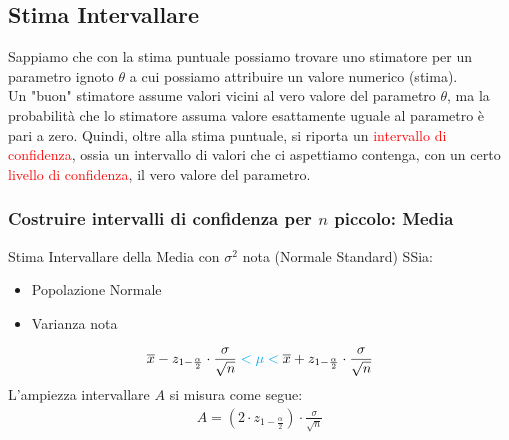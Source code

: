 \documentclass{article}  %
\theoremstyle{definition}
\begin{document}
\subsection{Stima Intervallare}
Sappiamo che con la stima puntuale possiamo trovare uno stimatore per un parametro ignoto $\theta$ a cui possiamo attribuire un valore numerico (stima). \\ Un "buon"
stimatore assume valori vicini al vero valore del parametro $\theta$, ma la probabilità che lo stimatore assuma valore esattamente uguale al parametro è pari a zero. Quindi, oltre
alla stima puntuale, si riporta un \textcolor{red}{intervallo di confidenza}, ossia un intervallo di valori che ci aspettiamo contenga, con un certo \textcolor{red}{livello di confidenza},
il vero valore del parametro.
\subsubsection{Costruire intervalli di confidenza per $n$ piccolo: Media}
\begin{theorem}{Stima Intervallare della Media con $\sigma^2$ nota (Normale Standard)}
	SSia:
	\begin{itemize}
		\item Popolazione Normale
		\item Varianza nota
	\end{itemize}
	\begin{align*}
		\overline{x}-z_{1-\frac{\alpha}{2}}\cdot \frac{\sigma}{\sqrt{n}} \textcolor{cyan}{\; < \mu < \;} \overline{x}+z_{1-\frac{\alpha}{2}}\cdot \frac{\sigma}{\sqrt{n}}
	\end{align*}
	L'ampiezza intervallare $A$ si misura come segue:
	\begin{align*}
		A = \left(2\cdot z_{1-\frac{\alpha}{2}}\right) \cdot \frac{\sigma}{\sqrt{n}}
	\end{align*}
\end{theorem}
\end{document}

